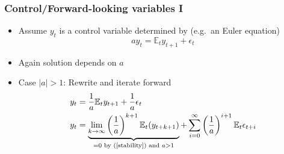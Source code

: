 \documentclass[handout,usepdftitle=false,xcolor=dvipsnames,aspectratio=169]{beamer}
\begin{document}
\begin{frame}
\frametitle{Control/Forward-looking variables I}
\begin{itemize}
\item Assume $y_t$ is a control variable determined by (e.g.\ an Euler equation)
\begin{equation}\label{equation1}
   a y_t  =  \mathbb{E}_t y_{t+1} +  \epsilon_t
\end{equation}
\item Again solution depends on $a$
\item Case $|a|  > 1$: Rewrite and iterate forward
\begin{align} \notag
  y_t &= \frac{1}{a}  \mathbb{E}_t y_{t+1} + \frac{1}{a} \epsilon_t \notag\\
  y_t &= \underbrace{\lim_{k \rightarrow \infty} \left(\frac{1}{a}\right)^{k+1} \mathbb{E}_t (y_{t+k+1})}_{=0 \text{ by (\ref{stability}) and } a>1 } +
  \sum_{i=0}^{\infty} \left(\frac{1}{a}\right)^{i+1} \mathbb{E}_t \epsilon_{t+i}
\end{align}

\end{itemize}
\end{frame}
\end{document}
